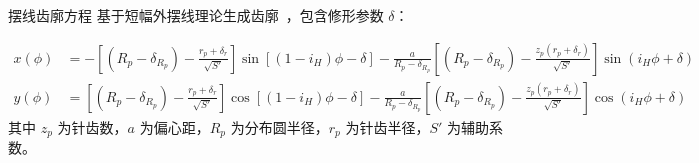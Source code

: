\documentclass[aspectratio=169,10pt,xcolor=table]{ctexbeamer}
\begin{document}
\begin{frame}{摆线齿廓方程}
  基于短幅外摆线理论生成齿廓~\cite{cycloidmodel}，包含修形参数 $\delta$：
  
  \scriptsize
  \begin{align}
    x(\phi) &= -\left[(R_p - \delta_{R_p}) - \frac{r_p + \delta_r}{\sqrt{S'}}\right]\sin\left[(1-i_H)\phi - \delta\right] 
    - \frac{a}{R_p - \delta_{R_p}}\left[(R_p - \delta_{R_p}) - \frac{z_p(r_p + \delta_r)}{\sqrt{S'}}\right]\sin(i_H\phi + \delta) \\
    y(\phi) &= \left[(R_p - \delta_{R_p}) - \frac{r_p + \delta_r}{\sqrt{S'}}\right]\cos\left[(1-i_H)\phi - \delta\right] 
    - \frac{a}{R_p - \delta_{R_p}}\left[(R_p - \delta_{R_p}) - \frac{z_p(r_p + \delta_r)}{\sqrt{S'}}\right]\cos(i_H\phi + \delta)
  \end{align}
  \normalsize
  其中 $z_p$ 为针齿数，$a$ 为偏心距，$R_p$ 为分布圆半径，$r_p$ 为针齿半径，$S'$ 为辅助系数。
\end{frame}
\end{document}
